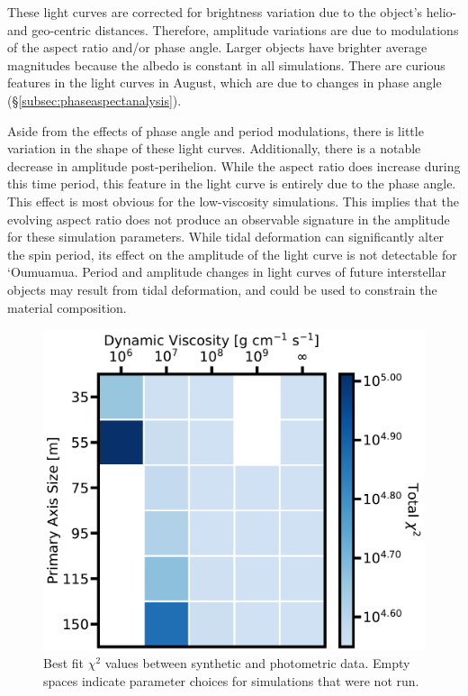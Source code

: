 \documentclass[twocolumn,doublespacing]{aastex631}
\begin{document}
These light curves are corrected for brightness variation due to the object's helio- and geo-centric distances. Therefore, amplitude variations are due to modulations of the aspect ratio and/or phase angle. Larger objects have brighter average magnitudes because the albedo is constant in all simulations. There are curious features in the light curves in August, which are due to changes in phase angle (\S \ref{subsec:phaseaspectanalysis}). 

Aside from the effects of phase angle and period modulations, there is little variation in the shape of these light curves. Additionally, there is a notable decrease in amplitude post-perihelion. While the aspect ratio does increase during this time period, this feature in the light curve is entirely due to the phase angle. This effect is most obvious for the low-viscosity simulations. This implies that the evolving aspect ratio does not produce an observable signature in the amplitude for these simulation parameters. While tidal deformation can significantly alter the spin period, its effect on the amplitude of the light curve is not detectable for `Oumuamua. Period and amplitude changes in light curves of future interstellar objects may result from tidal deformation, and could be used to constrain the material composition. 

\begin{figure}[ht]
\centering
\includegraphics[width=.98\linewidth,angle=0]{sim_chi2_heatmap.pdf}
\caption{Best fit $\chi^2$ values between synthetic and photometric data. Empty spaces indicate parameter choices for simulations that were not run.}
\label{fig:simdatachi2heatmap}
\end{figure}
\end{document}
